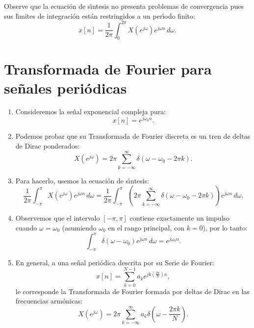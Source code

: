 Observe que la ecuaci\'{o}n de s\'{\i}ntesis no presenta problemas de convergencia pues sus l\'{\i}mites de integraci\'{o}n est\'{a}n restringidos a un per\'{\i}odo finito:
\begin{equation}
	x[n] = \frac{1}{2\pi} \int_{0}^{2\pi} X(e^{j\omega}) e^{j\omega n} \, d\omega.
\end{equation}

\section{Transformada de Fourier para se\~{n}ales peri\'{o}dicas}

\begin{enumerate}
	\item Consideremos la se\~{n}al exponencial compleja pura:
	\begin{equation}
		x[n] = e^{j\omega_{0}n}.
	\end{equation}
	
	\item Podemos probar que su Transformada de Fourier discreta es un tren de deltas de Dirac ponderados:
	\begin{equation}
		X(e^{j\omega}) = 2\pi \sum_{k=-\infty}^{\infty} \delta(\omega - \omega_{0} - 2\pi k).
	\end{equation}
	
	\item Para hacerlo, usemos la ecuaci\'{o}n de s\'{\i}ntesis:
	\begin{equation}
		\frac{1}{2\pi} \int_{-\pi}^{\pi} X(e^{j\omega}) e^{j\omega n} \, d\omega = \frac{1}{2\pi} \int_{-\pi}^{\pi} \left( 2\pi \sum_{k=-\infty}^{\infty} \delta(\omega - \omega_{0} - 2\pi k) \right) e^{j\omega n} \, d\omega.
	\end{equation}
	
	\item Observemos que el intervalo $[-\pi, \pi]$ contiene exactamente un impulso cuando $\omega = \omega_{0}$ (asumiendo $\omega_0$ en el rango principal, con $k=0$), por lo tanto:
	\begin{equation}
		\int_{-\pi}^{\pi} \delta(\omega - \omega_{0}) e^{j\omega n} \, d\omega = e^{j\omega_{0}n}.
	\end{equation}
	
	\item En general, a una se\~{n}al peri\'{o}dica descrita por su Serie de Fourier:
	\begin{equation}
		x[n] = \sum_{k=0}^{N-1} a_{k} e^{jk\left(\frac{2\pi}{N}\right)n},
	\end{equation}
	le corresponde la Transformada de Fourier formada por deltas de Dirac en las frecuencias armónicas:
	\begin{equation}
		X(e^{j\omega}) = 2\pi \sum_{k=-\infty}^{\infty} a_{k} \delta\left(\omega - \frac{2\pi k}{N}\right).
		\label{tfdperiodica}
	\end{equation}
	

\end{enumerate}
